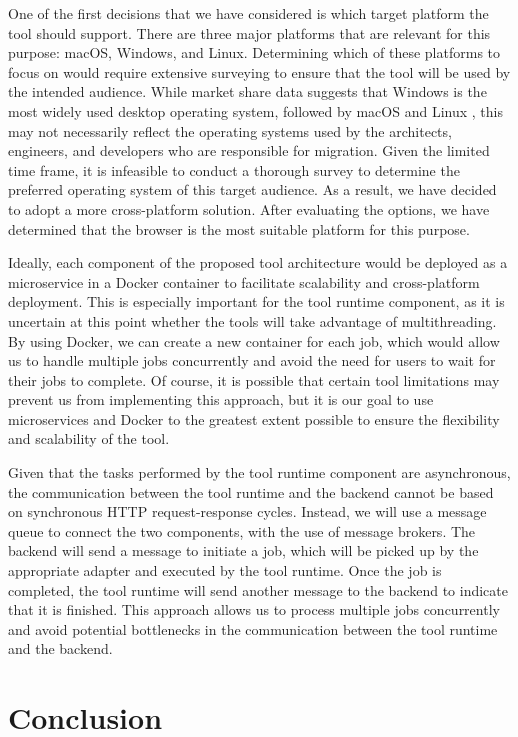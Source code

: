 \documentclass[conference]{IEEEtran}
\begin{document}
One of the first decisions that we have considered is which target platform the
tool should support. There are three major platforms that are relevant for this
purpose: macOS, Windows, and Linux. Determining which of these platforms to
focus on would require extensive surveying to ensure that the tool will be used
by the intended audience. While market share data suggests that Windows is the
most widely used desktop operating system, followed by macOS and Linux
\cite{desktop-usage-worldwide}, this may not necessarily reflect the operating
systems used by the architects, engineers, and developers who are responsible
for migration. Given the limited time frame, it is infeasible to conduct a
thorough survey to determine the preferred operating system of this target
audience. As a result, we have decided to adopt a more cross-platform solution.
After evaluating the options, we have determined that the browser is the most
suitable platform for this purpose.

Ideally, each component of the proposed tool architecture would be deployed as
a microservice in a Docker container to facilitate scalability and
cross-platform deployment. This is especially important for the tool runtime
component, as it is uncertain at this point whether the tools will take
advantage of multithreading. By using Docker, we can create a new container for
each job, which would allow us to handle multiple jobs concurrently and avoid
the need for users to wait for their jobs to complete. Of course, it is
possible that certain tool limitations may prevent us from implementing this
approach, but it is our goal to use microservices and Docker to the greatest
extent possible to ensure the flexibility and scalability of the tool.

Given that the tasks performed by the tool runtime component are asynchronous,
the communication between the tool runtime and the backend cannot be based on
synchronous HTTP request-response cycles. Instead, we will use a message queue
to connect the two components, with the use of message brokers. The backend
will send a message to initiate a job, which will be picked up by the
appropriate adapter and executed by the tool runtime. Once the job is
completed, the tool runtime will send another message to the backend to
indicate that it is finished. This approach allows us to process multiple jobs
concurrently and avoid potential bottlenecks in the communication between the
tool runtime and the backend.

\section{Conclusion}
\end{document}
